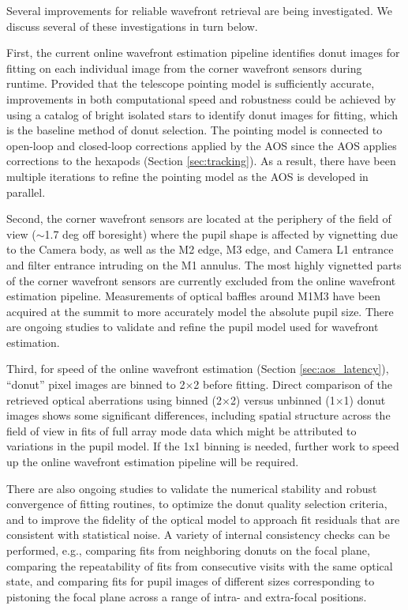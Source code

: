 \documentclass[SO,lsst,authoryear,toc]{lsstdoc}
\begin{document}
Several improvements for reliable wavefront retrieval are being investigated.
We discuss several of these investigations in turn below.

First, the current online wavefront estimation pipeline identifies donut images for fitting on each individual image from the corner wavefront sensors during runtime.
Provided that the telescope pointing model is sufficiently accurate, improvements in both computational speed and robustness could be achieved by using a catalog of bright isolated stars to identify donut images for fitting, which is the baseline method of donut selection.
The pointing model is connected to open-loop and closed-loop corrections applied by the AOS since the AOS applies corrections to the hexapods (Section \ref{sec:tracking}).
As a result, there have been multiple iterations to refine the pointing model as the AOS is developed in parallel.

Second, the corner wavefront sensors are located at the periphery of the field of view ($\sim$1.7 deg off boresight) where the pupil shape is affected by vignetting due to the Camera body, as well as the M2 edge, M3 edge, and Camera L1 entrance and filter entrance intruding on the M1 annulus.
The most highly vignetted parts of the corner wavefront sensors are currently excluded from the online wavefront estimation pipeline.
Measurements of optical baffles around M1M3 have been acquired at the summit to more accurately model the absolute pupil size.
There are ongoing studies to validate and refine the pupil model used for wavefront estimation.

Third, for speed of the online wavefront estimation (Section \ref{sec:aos_latency}), ``donut'' pixel images are binned to 2$\times$2 before fitting.
Direct comparison of the retrieved optical aberrations using binned (2$\times$2) versus unbinned (1$\times$1) donut images shows some significant differences, including spatial structure across the field of view in fits of full array mode data which might be attributed to variations in the pupil model.
If the 1x1 binning is needed, further work to speed up the online wavefront estimation pipeline will be required.

There are also ongoing studies to validate the numerical stability and robust convergence of fitting routines, to optimize the donut quality selection criteria, and to improve the fidelity of the optical model to approach fit residuals that are consistent with statistical noise.
A variety of internal consistency checks can be performed, e.g., comparing fits from neighboring donuts on the focal plane, comparing the repeatability of fits from consecutive visits with the same optical state, and comparing fits for pupil images of different sizes corresponding to pistoning the focal plane across a range of intra- and extra-focal positions.
\end{document}

